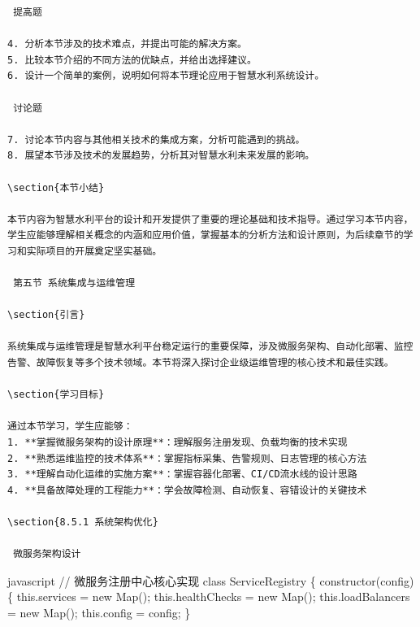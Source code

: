 \begin{lstlisting}
 提高题

4. 分析本节涉及的技术难点，并提出可能的解决方案。
5. 比较本节介绍的不同方法的优缺点，并给出选择建议。
6. 设计一个简单的案例，说明如何将本节理论应用于智慧水利系统设计。

 讨论题

7. 讨论本节内容与其他相关技术的集成方案，分析可能遇到的挑战。
8. 展望本节涉及技术的发展趋势，分析其对智慧水利未来发展的影响。

\section{本节小结}

本节内容为智慧水利平台的设计和开发提供了重要的理论基础和技术指导。通过学习本节内容，学生应能够理解相关概念的内涵和应用价值，掌握基本的分析方法和设计原则，为后续章节的学习和实际项目的开展奠定坚实基础。

 第五节 系统集成与运维管理

\section{引言}

系统集成与运维管理是智慧水利平台稳定运行的重要保障，涉及微服务架构、自动化部署、监控告警、故障恢复等多个技术领域。本节将深入探讨企业级运维管理的核心技术和最佳实践。

\section{学习目标}

通过本节学习，学生应能够：
1. **掌握微服务架构的设计原理**：理解服务注册发现、负载均衡的技术实现
2. **熟悉运维监控的技术体系**：掌握指标采集、告警规则、日志管理的核心方法
3. **理解自动化运维的实施方案**：掌握容器化部署、CI/CD流水线的设计思路
4. **具备故障处理的工程能力**：学会故障检测、自动恢复、容错设计的关键技术

\section{8.5.1 系统架构优化}

 微服务架构设计
\end{lstlisting}

javascript // 微服务注册中心核心实现 class ServiceRegistry \{ constructor(config) \{ this.services = new Map(); this.healthChecks = new Map(); this.loadBalancers = new Map(); this.config = config; \}

